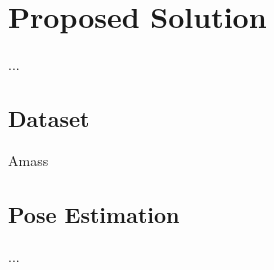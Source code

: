\chapter{Proposed Solution}
\label{chap:Solution}

...

\section{Dataset}

Amass \cite{AMASS:ICCV:2019}

\section{Pose Estimation}

...

